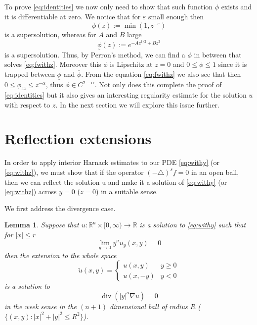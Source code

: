 \documentclass[letterpaper]{article}
\newtheorem{lemma}[thm]{Lemma}
\numberwithin{equation}{section}
\newcommand{\abs}[1]{\left\vert#1\right\vert}
\newcommand{\R}{\mathbb R}
\newcommand{\eps}{\varepsilon}
\newcommand{\grad} {\nabla}
\newcommand{\lap} {\triangle}
\DeclareMathOperator{\dv}{div}
\newcommand{\party}[1] {#1_y}
\newcommand{\partzz}[1] {#1_{zz}}
\begin{document}
To prove \eqref{eq:identities} we now only need to show that such function $\phi$ exists and it is differentiable at zero. We notice that for $\eps$ small enough then
\[ \overline \phi (z) := \min (1, z^{-\eps}) \]
is a supersolution, whereas for $A$ and $B$ large
\[ \underline{\phi}(z) := e^{-A z^{1/2} + B z^2} \]
is a supersolution. Thus, by Perron's method, we can find a $\phi$ in between that solves \eqref{eq:fwithz}. Moreover this $\phi$ is Lipschitz at $z=0$ and $0 \leq \phi \leq 1$ since it is trapped between $\underline{\phi}$ and $\overline{\phi}$. From the equation \eqref{eq:fwithz} we also see that then $0 \leq \partzz \phi \leq z^{-\alpha}$, thus $\phi \in C^{2-\alpha}$. Not only does this complete the proof of \eqref{eq:identities} but it also gives an interesting regularity estimate for the solution $u$ with respect to $z$. In the next section we will explore this issue further.

\section{Reflection extensions}
In order to apply interior Harnack estimates to our PDE \eqref{eq:withy} (or \eqref{eq:withz}), we must show that if the operator $(-\lap)^s f = 0$ in an open ball, then we can reflect the solution u and make it a solution of \eqref{eq:withy} (or \eqref{eq:withz}) across $y=0$ ($z=0$) in a suitable sense.

We first address the divergence case.
\begin{lemma} \label{lem:dref}
Suppose that $u : \R^n \times [0,\infty) \to \R$ is a solution to \eqref{eq:withy} such that for $|x| \leq r$
\begin{equation} \label{eq:zeron}
 \lim_{y \to 0} y^a \party u(x,y)=0
\end{equation}
then the extension to the whole space
\[ \tilde{u}(x,y) = \begin{cases}
u(x,y) & y \geq 0 \\
u(x,-y) & y<0
\end{cases} \]
is a solution to %
\[ \dv( |y|^a \grad u ) = 0 \]
in the week sense in the $(n+1)$ dimensional ball of radius $R$ ($\{ (x,y) : \abs{x}^2 + \abs{y}^2 \leq R^2 \}$).
\end{lemma}
\end{document}
